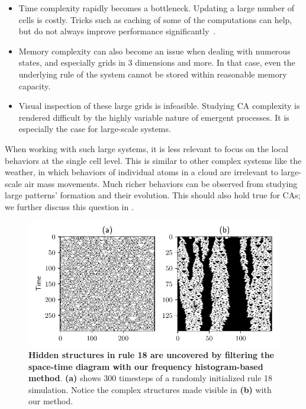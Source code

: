 \begin{itemize}
\item Time complexity rapidly becomes a bottleneck. Updating a large number of
  cells is costly. Tricks such as caching of some of the computations can help,
  but do not always improve performance
  significantly~\parencite{gosperExploitingRegularitiesLarge1984}.

\item Memory complexity can also become an issue when dealing with numerous
  states, and especially grids in 3 dimensions and more. In that case, even the
  underlying rule of the system cannot be stored within reasonable memory
  capacity.

\item Visual inspection of these large grids is infeasible. Studying CA
  complexity is rendered difficult by the highly variable nature of emergent
  processes. It is especially the case for large-scale systems.

\end{itemize}
When working with such large systems, it is less relevant to focus on the local
behaviors at the single cell level. This is similar to other complex systems
like the weather, in which behaviors of individual atoms in a cloud are
irrelevant to large-scale air mass movements. Much richer behaviors can be
observed from studying large patterns' formation and their evolution. This
should also hold true for CAs; we further discuss this question in
.

\begin{figure}[th]
  \centering
  \includegraphics[width=.93\linewidth]{figures/rule18_small.pdf}
  \caption{\label{fig:rule18_small} \textbf{Hidden structures in rule 18 are
      uncovered by filtering the space-time diagram with our frequency
      histogram-based method}. \textbf{(a)} shows 300 timesteps of a randomly
    initialized rule 18 simulation. Notice the complex structures made visible
    in \textbf{(b)} with our method.}
\end{figure}

